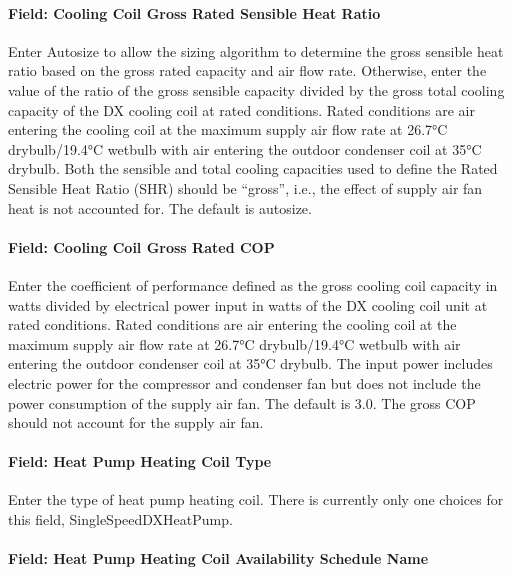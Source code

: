 \paragraph{Field: Cooling Coil Gross Rated Sensible Heat Ratio}\label{field-cooling-coil-gross-rated-sensible-heat-ratio-1}

Enter Autosize to allow the sizing algorithm to determine the gross sensible heat ratio based on the gross rated capacity and air flow rate. Otherwise, enter the value of the ratio of the gross sensible capacity divided by the gross total cooling capacity of the DX cooling coil at rated conditions. Rated conditions are air entering the cooling coil at the maximum supply air flow rate at 26.7°C drybulb/19.4°C wetbulb with air entering the outdoor condenser coil at 35°C drybulb. Both the sensible and total cooling capacities used to define the Rated Sensible Heat Ratio (SHR) should be ``gross'', i.e., the effect of supply air fan heat is not accounted for. The default is autosize.

\paragraph{Field: Cooling Coil Gross Rated COP}\label{field-cooling-coil-gross-rated-cop}

Enter the coefficient of performance defined as the gross cooling coil capacity in watts divided by electrical power input in watts of the DX cooling coil unit at rated conditions. Rated conditions are air entering the cooling coil at the maximum supply air flow rate at 26.7°C drybulb/19.4°C wetbulb with air entering the outdoor condenser coil at 35°C drybulb. The input power includes electric power for the compressor and condenser fan but does not include the power consumption of the supply air fan. The default is 3.0. The gross COP should not account for the supply air fan.

\paragraph{Field: Heat Pump Heating Coil Type}\label{field-heat-pump-heating-coil-type}

Enter the type of heat pump heating coil. There is currently only one choices for this field, SingleSpeedDXHeatPump.

\paragraph{Field: Heat Pump Heating Coil Availability Schedule Name}\label{field-heat-pump-heating-coil-availability-schedule-name}


